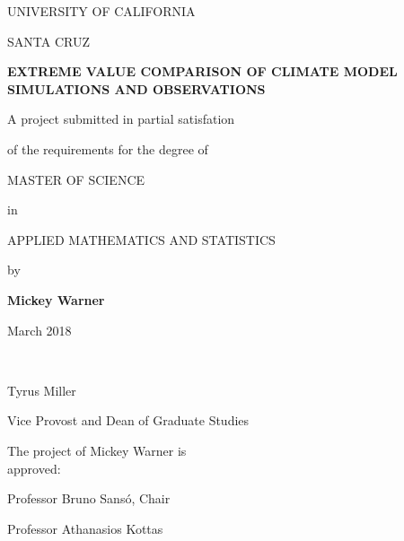 \thispagestyle{empty} %

\singlespacing

\begin{center}
UNIVERSITY OF CALIFORNIA
\bigskip

SANTA CRUZ
\bigskip
\bigskip
\bigskip

\textbf{EXTREME VALUE COMPARISON OF CLIMATE MODEL SIMULATIONS AND OBSERVATIONS}
\bigskip
\bigskip
\bigskip

A project submitted in partial satisfation

of the requirements for the degree of
\bigskip
\bigskip

MASTER OF SCIENCE
\bigskip

in
\bigskip

APPLIED MATHEMATICS AND STATISTICS
\bigskip
\bigskip

by
\bigskip
\bigskip

\textbf{Mickey Warner}
\bigskip

March 2018
\bigskip
\bigskip

\end{center}


\begin{multicols*}{2}

\ 

\bigskip
\bigskip
\bigskip
\bigskip
\bigskip
\bigskip
\bigskip
\bigskip
\bigskip
\bigskip
\bigskip
\bigskip
\bigskip
\bigskip
\bigskip
\bigskip
\bigskip


\hline
\bigskip
\noindent Tyrus Miller

\noindent Vice Provost and Dean of Graduate Studies



\noindent The project of Mickey Warner is\\approved:
\bigskip
\bigskip
\bigskip
\bigskip

\hline
\bigskip
\noindent Professor Bruno Sans{\'o}, Chair
\bigskip
\bigskip
\bigskip
\bigskip

\hline
\bigskip
\noindent Professor Athanasios Kottas


\end{multicols*}




\doublespacing

\newpage
